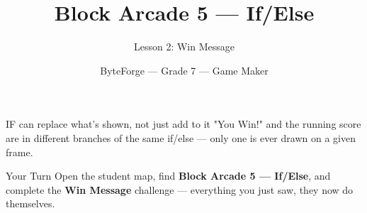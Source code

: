 \documentclass[aspectratio=169]{beamer}
\title{Block Arcade 5 — If/Else}
\subtitle{Lesson 2: Win Message}
\author{ByteForge --- Grade 7 --- Game Maker}
\date{}
\begin{document}
\begin{frame}
    \titlepage
\end{frame}

\begin{frame}{IF can replace what's shown, not just add to it}
    \Large
    "You Win!" and the running score are in different branches of the same if/else — only one is ever drawn on a given frame.

    \begin{center}
    \end{center}
\end{frame}

\begin{frame}{Your Turn}
    \Large
    Open the student map, find \textbf{Block Arcade 5 — If/Else}, and complete
    the \textbf{Win Message} challenge --- everything you just saw, they now do themselves.
\end{frame}
\end{document}
